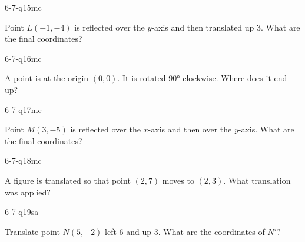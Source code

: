 \begin{practiceQuestion}{6-7-q15}{mc}
\begin{questionText}
Point $L(-1, -4)$ is reflected over the $y$-axis and then translated up $3$. What are the final coordinates?
\end{questionText}
\end{practiceQuestion}

\begin{practiceQuestion}{6-7-q16}{mc}
\begin{questionText}
A point is at the origin $(0, 0)$. It is rotated $90°$ clockwise. Where does it end up?
\end{questionText}
\end{practiceQuestion}

\begin{practiceQuestion}{6-7-q17}{mc}
\begin{questionText}
Point $M(3, -5)$ is reflected over the $x$-axis and then over the $y$-axis. What are the final coordinates?
\end{questionText}
\end{practiceQuestion}

\begin{practiceQuestion}{6-7-q18}{mc}
\begin{questionText}
A figure is translated so that point $(2, 7)$ moves to $(2, 3)$. What translation was applied?
\end{questionText}
\end{practiceQuestion}


\begin{practiceQuestion}{6-7-q19}{sa}
\begin{questionText}
Translate point $N(5, -2)$ left $6$ and up $3$. What are the coordinates of $N'$?
\end{questionText}
\end{practiceQuestion}

